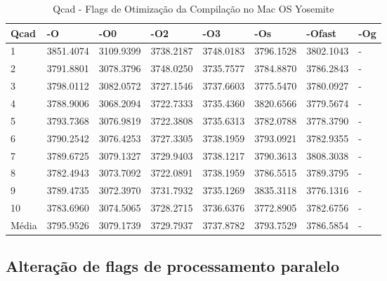\begin{table}[!ht]
\centering
\caption{Qcad - Flags de Otimização da Compilação no Mac OS Yosemite}
\label{tab:otimizacao_compilacao:mac:qcad}
\begin{tabular}{llllllll}
\textbf{Qcad}         & \textbf{-O}  & \textbf{-O0}   & \textbf{-O2} & \textbf{-O3} & \textbf{-Os} & \textbf{-Ofast} & \textbf{-Og} \\ \toprule
1                     & 3851.4074    &   3109.9399    &   3738.2187  &   3748.0183  &   3796.1528  &   3802.1043     &  -           \\ 
2                     & 3791.8801    &   3078.3796    &   3748.0250  &   3735.7577  &   3784.8870  &   3786.2843     &  -           \\ 
3                     & 3798.0112    &   3082.0572    &   3727.1546  &   3737.6603  &   3775.5470  &   3780.0927     &  -           \\ 
4                     & 3788.9006    &   3068.2094    &   3722.7333  &   3735.4360  &   3820.6566  &   3779.5674     &  -           \\ 
5                     & 3793.7368    &   3076.9819    &   3722.3808  &   3735.6313  &   3782.0788  &   3778.3790     &  -           \\ 
6                     & 3790.2542    &   3076.4253    &   3727.3305  &   3738.1959  &   3793.0921  &   3782.9355     &  -           \\ 
7                     & 3789.6725    &   3079.1327    &   3729.9403  &   3738.1217  &   3790.3613  &   3808.3038     &  -           \\ 
8                     & 3782.4943    &   3073.7092    &   3722.0891  &   3738.1959  &   3786.5515  &   3789.3795     &  -           \\ 
9                     & 3789.4735    &   3072.3970    &   3731.7932  &   3735.1269  &   3835.3118  &   3776.1316     &  -           \\ 
10                    & 3783.6960    &   3074.5065    &   3728.2715  &   3736.6376  &   3772.8905  &   3782.6756     &  -           \\ \bottomrule
Média                 & 3795.9526    &   3079.1739    &   3729.7937  &   3737.8782  &   3793.7529  &   3786.5854     &  -           \\ 
\end{tabular}
\end{table}

\clearpage
\subsection{Alteração de flags de processamento paralelo}

